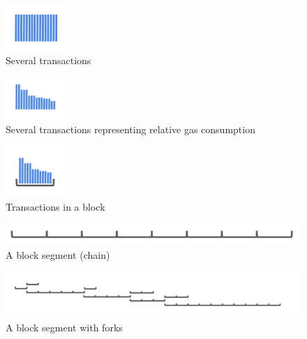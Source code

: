 \documentclass[11pt]{article}
\theoremstyle{plain}
\begin{document}
\begin{figure}[tph]
    \centering
    \includegraphics[width=0.2\textwidth]{imgs/vis_tx_set.png}
    \caption{Several transactions}
    \label{fig:txs}
\end{figure}

\begin{figure}[tph]
    \centering
    \includegraphics[width=0.2\textwidth]{imgs/vis_tx_set_sized.png}
    \caption{Several transactions representing relative gas consumption}
    \label{fig:txsgas}
\end{figure}

\begin{figure}[tph]
    \centering
    \includegraphics[width=0.2\textwidth]{imgs/vis_blocktxs.png}
    \caption{Transactions in a block}
    \label{fig:blocktxs}
\end{figure}

\begin{figure}[tph]
    \centering
    \includegraphics[width=1.0\textwidth]{imgs/vis_blocksegment.png}
    \caption{A block segment (chain)}
    \label{fig:blocksegment}
\end{figure}

\begin{figure}[tph]
    \centering
    \includegraphics[width=1.0\textwidth]{imgs/vis_blocksegment_forking.png}
    \caption{A block segment with forks}
    \label{fig:blocksegment_forks}
\end{figure}
\end{document}
